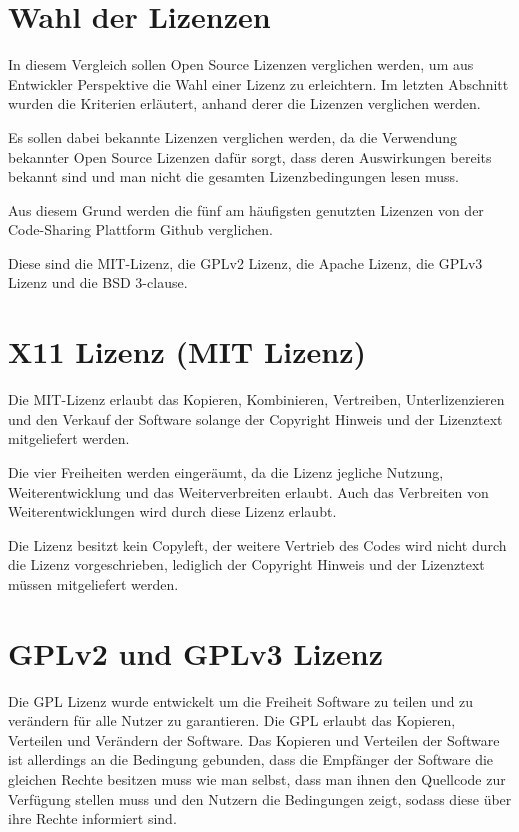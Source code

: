 \section{Wahl der Lizenzen}
In diesem Vergleich sollen Open Source Lizenzen verglichen werden, um aus Entwickler Perspektive die Wahl einer Lizenz zu erleichtern. Im letzten Abschnitt wurden die Kriterien erl\"autert, anhand derer die Lizenzen verglichen werden. 

Es sollen dabei bekannte Lizenzen verglichen werden, da die Verwendung bekannter Open Source Lizenzen daf\"ur sorgt, dass deren Auswirkungen bereits bekannt sind und man nicht die gesamten Lizenzbedingungen lesen muss. 

Aus diesem Grund werden die f\"unf am h\"aufigsten genutzten Lizenzen von der Code-Sharing Plattform Github verglichen. 

Diese sind die MIT-Lizenz, die GPLv2 Lizenz, die Apache Lizenz, die GPLv3 Lizenz und die BSD 3-clause. 

\section{X11 Lizenz (MIT Lizenz)}

Die MIT-Lizenz erlaubt das Kopieren, Kombinieren, Vertreiben, Unterlizenzieren und den Verkauf der Software solange der Copyright Hinweis und der Lizenztext mitgeliefert werden. 

Die vier Freiheiten werden einger\"aumt, da die Lizenz jegliche Nutzung, Weiterentwicklung und das Weiterverbreiten erlaubt. Auch das Verbreiten von Weiterentwicklungen wird durch diese Lizenz erlaubt. 

Die Lizenz besitzt kein Copyleft, der weitere Vertrieb des Codes wird nicht durch die Lizenz vorgeschrieben, lediglich der Copyright Hinweis und der Lizenztext m\"ussen mitgeliefert werden. 

\section{GPLv2 und GPLv3 Lizenz}

Die GPL Lizenz wurde entwickelt um die Freiheit Software zu teilen und zu ver\"andern f\"ur alle Nutzer zu garantieren. Die GPL erlaubt das Kopieren, Verteilen und Ver\"andern der Software. Das Kopieren und Verteilen der Software ist allerdings an die Bedingung gebunden, dass die Empf\"anger der Software die gleichen Rechte besitzen muss wie man selbst, dass man ihnen den Quellcode zur Verf\"ugung stellen muss und den Nutzern die Bedingungen zeigt, sodass diese \"uber ihre Rechte informiert sind.  

